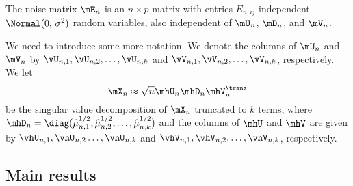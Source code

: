 \begin{assumption}\label{A:noise}
    The noise matrix $\mE_n$ is an $n\times p$ matrix with entries 
    $E_{n,ij}$ independent $\Normal(0,\, \sigma^2)$ random variables, also
    independent of $\mU_n$, $\mD_n$, and $\mV_n$.
\end{assumption}
\noindent

We need to introduce some more notation. We denote the columns of $\mU_n$ and
$\mV_n$ by $\vU_{n,1}, \vU_{n,2}, \ldots, \vU_{n,k}$ and $\vV_{n,1},
\vV_{n,2}, \ldots, \vV_{n,k}$, respectively. We let 
\[
    \mX_n \approx \sqrt{n} \mhU_n \mhD_n \mhV_n^\trans
\]
be the singular value decomposition of
$\mX_n$ truncated to $k$ terms, where $\mhD_n = \diag( \hat \mu_{n,1}^{1/2},
\hat \mu_{n,2}^{1/2}, \ldots, \hat \mu_{n,k}^{1/2})$ and the columns of $\mhU$ and $\mhV$ are given
by $\vhU_{n,1}, \vhU_{n,2} \ldots, \vhU_{n,k}$ and $\vhV_{n,1}, \vhV_{n,2},
\ldots, \vhV_{n,k}$, respectively.


\subsection{Main results}

